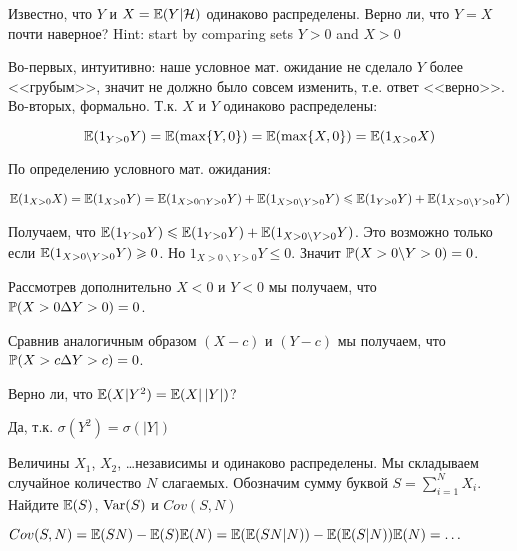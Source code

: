\begin{solution}
\begin{solution}
\begin{solution}
\begin{solution}
\begin{solution}
\begin{solution}
\begin{solution}
\begin{problem}
Известно, что $ Y $ и $ X=\E(Y|\mathcal{H}) $ одинаково распределены. Верно ли, что $ Y=X $ почти наверное? Hint: start by comparing sets $ Y>0 $ and $ X>0 $
\end{problem} 
\begin{solution} 
Во-первых, интуитивно: наше условное мат. ожидание не сделало $ Y $ более <<грубым>>, значит не должно было совсем изменить, т.е. ответ <<верно>>. Во-вторых, формально. Т.к. $ X $ и $ Y $ одинаково распределены:

\[ \E(1_{Y>0}Y)=\E(\max\{Y,0\})=\E(\max\{X,0\})=\E(1_{X>0}X) \]

По определению условного мат. ожидания:

\[ \E(1_{X>0}X)=\E(1_{X>0}Y)=\E(1_{X>0\cap Y>0} Y)+\E(1_{X>0\backslash Y>0} Y)\leq \E(1_{ Y>0} Y)+\E(1_{X>0\backslash Y>0} Y)\]

Получаем, что $ \E(1_{Y>0}Y) \leq \E(1_{ Y>0} Y)+\E(1_{X>0\backslash Y>0} Y) $. Это возможно только если $ \E(1_{X>0\backslash Y>0} Y)\geq 0 $. Но $ 1_{X>0\backslash Y>0} Y \leq 0$. Значит $ \P(X>0 \backslash Y>0)=0 $.

Рассмотрев дополнительно $ X<0 $ и $ Y<0 $ мы получаем, что $ \P(X>0 \Delta Y>0)=0 $.

Сравнив аналогичным образом $ (X-c) $ и $ (Y-c) $ мы получаем, что $ \P(X>c \Delta Y>c)=0 $.


\end{solution}

\begin{problem}
Верно ли, что $\E(X|Y^{2})=\E(X|\,|Y|)$?
\end{problem} 
\begin{solution} 
Да, т.к. $\sigma(Y^{2})=\sigma(|Y|)$
\end{solution}

\begin{problem}
Величины $X_1$, $X_2$, \ldots независимы и одинаково распределены. Мы складываем случайное количество $N$ слагаемых. Обозначим сумму буквой $S=\sum_{i=1}^{N}X_i$. Найдите $\E(S)$, $\Var(S)$ и $Cov(S,N)$
\end{problem} 
\begin{solution} 
 $Cov(S,N)=\E(SN)-\E(S)\E(N)=\E(\E(SN|N))-\E(\E(S|N))\E(N)=\ldots$ 
\end{solution}


\end{solution}
\end{solution}
\end{solution}
\end{solution}
\end{solution}
\end{solution}
\end{solution}
